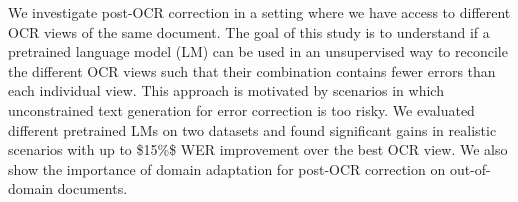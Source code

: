 We investigate post-OCR correction in a setting where we have access to different OCR views of the same document. The goal of this study is to understand if a pretrained language model (LM) can be used in an unsupervised way to reconcile the different OCR views such that their combination contains fewer errors than each individual view. This approach is motivated by scenarios in which unconstrained text generation for error correction is too risky. We evaluated different pretrained LMs on two datasets and found significant gains in realistic scenarios with up to \$15\%\$ WER improvement over the best OCR view. We also show the importance of domain adaptation for post-OCR correction on out-of-domain documents.
